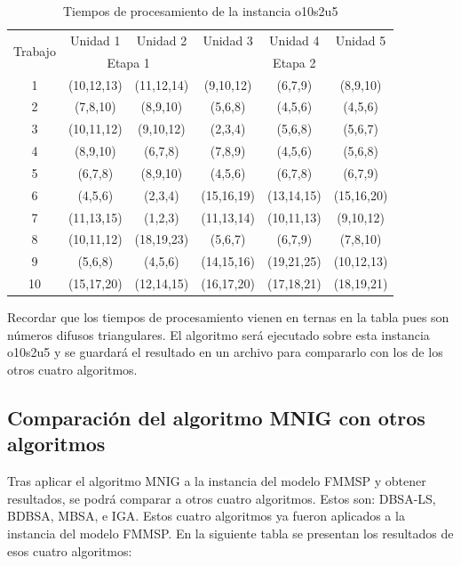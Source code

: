 \documentclass{article}
\begin{document}
\begin{table}[h]
    \caption{Tiempos de procesamiento de la instancia o10s2u5}
    \label{tab:tProc}
    \begin{center}
    \begin{tabular}{c|c|c|c|c|c}
        \hline
        \multirow{2}{*}{Trabajo} & Unidad 1 & Unidad 2 & Unidad 3 & Unidad 4 & Unidad 5\\
        \cline{2-6}
        & \multicolumn{2}{c|}{Etapa 1} & \multicolumn{3}{c}{Etapa 2}\\
        \hline
        1 & (10,12,13) & (11,12,14) & (9,10,12) & (6,7,9) & (8,9,10)\\
        2 & (7,8,10) & (8,9,10) & (5,6,8) & (4,5,6) & (4,5,6) \\
        3 & (10,11,12) & (9,10,12) & (2,3,4) & (5,6,8) & (5,6,7) \\
        4 & (8,9,10) & (6,7,8) & (7,8,9) & (4,5,6) & (5,6,8) \\
        5 & (6,7,8) & (8,9,10) & (4,5,6) & (6,7,8) & (6,7,9) \\
        6 & (4,5,6) & (2,3,4) & (15,16,19) & (13,14,15) & (15,16,20) \\
        7 & (11,13,15) & (1,2,3) & (11,13,14) & (10,11,13) & (9,10,12) \\
        8 & (10,11,12) & (18,19,23) & (5,6,7) & (6,7,9) & (7,8,10) \\
        9 & (5,6,8) & (4,5,6) & (14,15,16) & (19,21,25) & (10,12,13) \\
        10 & (15,17,20) & (12,14,15) & (16,17,20) & (17,18,21) & (18,19,21) \\
        \hline
    \end{tabular}
    \end{center}
\end{table}

Recordar que los tiempos de procesamiento vienen en ternas en la tabla pues son números difusos triangulares. El algoritmo será ejecutado sobre esta instancia o10s2u5 y se guardará el resultado en un archivo para compararlo con los de los otros cuatro algoritmos.

\subsection{Comparación del algoritmo MNIG con otros algoritmos}

Tras aplicar el algoritmo MNIG a la instancia del modelo FMMSP y obtener resultados, se podrá comparar a otros cuatro algoritmos. Estos son: DBSA-LS, BDBSA, MBSA, e IGA. Estos cuatro algoritmos ya fueron aplicados a la instancia del modelo FMMSP. En la siguiente tabla se presentan los resultados de esos cuatro algoritmos: \autocite{modFMMSP}
\end{document}
